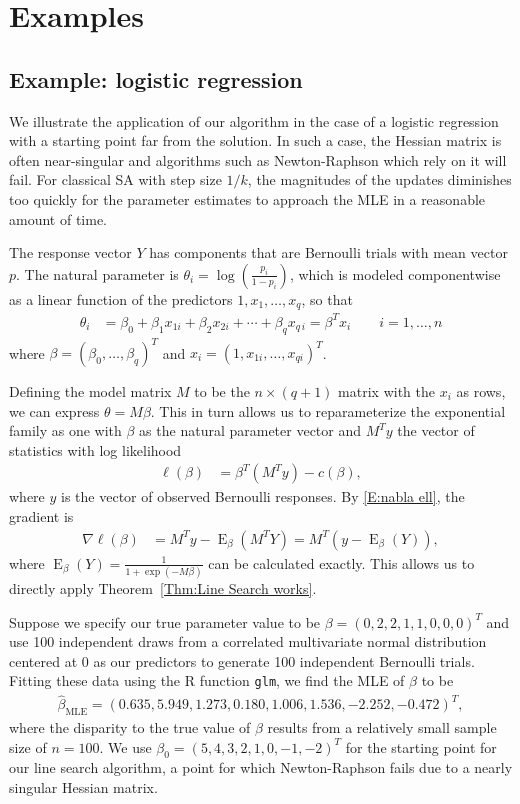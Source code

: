 \documentclass[oneside]{myumnStatThesis}
\DeclareMathOperator{\E}{E}
\newcommand{\betaMLE}{\hat{\beta}_{\textrm{MLE}}}
\begin{document}
\chapter{Examples} \label{S:Examples}
\section{Example: logistic regression}
We illustrate the application of our algorithm in the case of a logistic regression with a starting point far from the 
solution.  In such a case, the Hessian matrix is often near-singular and algorithms such as Newton-Raphson which rely 
on it will fail.  For classical SA with step size $1/k$, the magnitudes of the updates diminishes too quickly for 
the parameter estimates to approach the MLE in a reasonable amount of time.

The response vector $Y$ has components that are Bernoulli trials with mean vector $p$.  The natural parameter is $
\theta_i = \log \left( \frac{p_i}{1-p_i} \right )$, which is modeled componentwise as a linear function of the 
predictors $1, x_1, \ldots, x_{q}$, so that
\begin{align*}
	\theta_i &= \beta_0 + \beta_1 x_{1i} + \beta_2 x_{2i} + \cdots + \beta_{q} x_{q\,i} = \beta^T x_i \qquad
i = 1, \ldots, n
\end{align*}
where $\beta = (\beta_0, \ldots, \beta_{q} )^T$ and $x_i = ( 1, x_{1i}, \ldots, x_{q i})^T$.  

Defining the model matrix $M$ to be the $n \times (q+1)$ matrix with the $x_i$ as rows, we can express $\theta = M \beta
$.  This in turn allows us to reparameterize the exponential family  as one with $\beta$ as the natural parameter 
vector and $M^T y$ the vector of statistics with log likelihood
\begin{align*}
		 \ell(\beta) &=  \beta^T (M^T y) - c(\beta),
\end{align*}
where $y$ is the vector of observed Bernoulli responses.
By \eqref{E:nabla ell}, the gradient is
\begin{align*}
	\nabla \ell( \beta ) &=  M^T y - \E_{\beta}(M^T Y) = M^T( y - \E_{\beta}(Y) ),
\end{align*}
where $\E_{\beta}(Y) = \frac{1}{1 + \exp(-M \beta)}$ can be calculated exactly.  This allows us to directly apply 
Theorem~\ref{Thm:Line Search works}.

Suppose we specify our true parameter value to be $\beta = (0, 2, 2, 1, 1, 0, 0, 0)^T$ and use 100 independent draws 
from a correlated multivariate normal distribution centered at 0 as our predictors to generate 100 independent 
Bernoulli trials.  
Fitting these data using the R function \texttt{glm}, we find the MLE of $\beta$ to be
\begin{align*}
	\betaMLE = (  0.635,  5.949, 1.273, 0.180, 1.006, 1.536, -2.252, -0.472 )^T,
\end{align*}
where the disparity to the true value of $\beta$ results from a relatively small sample size of $n=100$.
We use $\beta_0 = ( 5, 4, 3, 2, 1, 0, -1, -2)^T$ for the starting point for our line search algorithm, a point for 
which Newton-Raphson fails due to a nearly singular Hessian matrix.  
\end{document}
